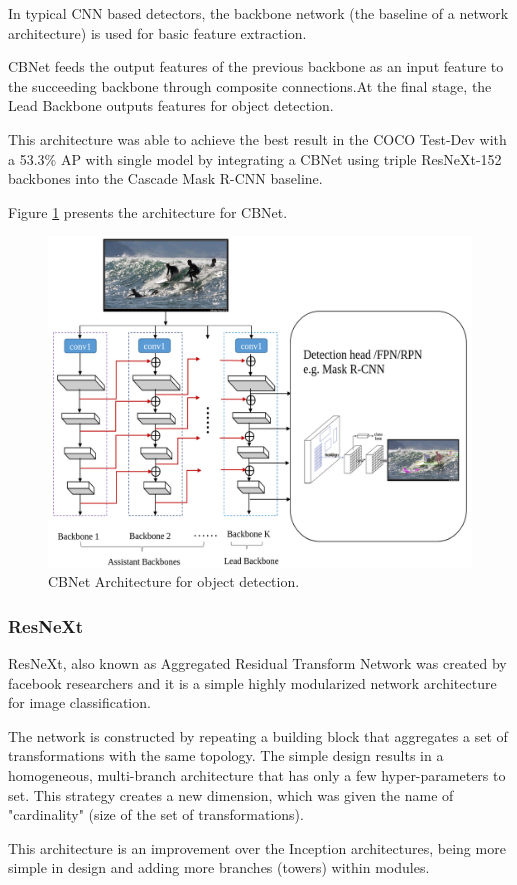 \par In typical CNN based detectors, the backbone network (the baseline of a network architecture) is used for basic feature extraction.

\par CBNet feeds the output features of the previous backbone as an input feature to the succeeding backbone through composite connections.At the final stage, the Lead Backbone outputs features for object detection.

\par This architecture was able to achieve the best result in the COCO Test-Dev with a 53.3\% AP with single model by integrating a CBNet using triple ResNeXt-152 \cite{Xie2017} backbones into the Cascade Mask R-CNN baseline.
\par Figure \ref{fig:cbnet} presents the architecture for CBNet.



\begin{figure}[htb]
    \centering
    \includegraphics[scale = 0.25]{Sections/2StateOfTheArt/2_images/cbnet.png}
    \caption{CBNet Architecture for object detection.} 
    \label{fig:cbnet}
\end{figure}

\subsubsection{ResNeXt}
\label{sec:resnext}
\par ResNeXt, also known as Aggregated Residual Transform Network was created by facebook researchers and it is a simple highly modularized network architecture for image classification. 
\par The network is constructed by repeating a building block that aggregates a set of transformations with the same topology. The simple design results in a homogeneous, multi-branch architecture that has only a few hyper-parameters to set. This strategy creates a new dimension, which was given the name of "cardinality" (size of the set of transformations). 
\par This architecture is an improvement over the Inception architectures, being more simple in design and adding more branches (towers) within modules. \cite{Xie2017}


